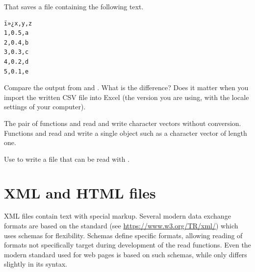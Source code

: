 \documentclass[krantz2]{krantz}\usepackage{knitr}%
\begin{document}
That saves a file containing the following text.
\begin{knitrout}\footnotesize
{}\color{fgcolor}\begin{kframe}
\begin{verbatim}
ï»¿x,y,z
1,0.5,a
2,0.4,b
3,0.3,c
4,0.2,d
5,0.1,e
\end{verbatim}
\end{kframe}
\end{knitrout}

\begin{playground}
Compare the output from  and . What is the difference? Does it matter when you import the written CSV file into Excel (the version you are using, with the locale settings of your computer).
\end{playground}

The pair of functions  and  read and write character vectors without conversion. Functions  and  read and write a single object such as a character vector of length one.

\begin{advplayground}
Use  to write a file that can be read with .
\end{advplayground}

\section{XML and HTML files}

XML files contain text with special markup. Several modern data exchange formats are based on the  standard (see \url{https://www.w3.org/TR/xml/}) which uses schemas for flexibility. Schemas define specific formats, allowing reading of formats not specifically target during development of the read functions. Even the modern  standard used for web pages is based on such schemas, while  only differs slightly in its syntax.

\subsection['xml2']{}
\end{document}

